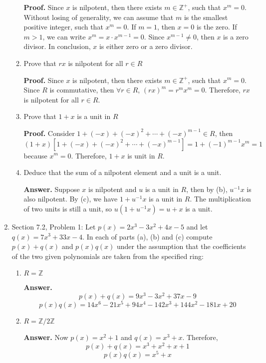 \documentclass[12pt]{article}
\newcommand{\Z}{\mathbb{Z}}
\begin{document}
\begin{enumerate}
\begin{enumerate}
    \smallskip
    {\bf Proof. }Since $x$ is nilpotent, then there exists $m \in \Z^+$, such that $x^m = 0$. Without losing of generality, we can assume that $m$ is the smallest positive integer, such that $x^m = 0$. If $m = 1$, then $x = 0$ is the zero. If $m > 1$, we can write $x^m = x \cdot x^{m-1} = 0$. Since $x^{m-1} \neq 0$, then $x$ is a zero divisor. In conclusion, $x$ is either zero or a zero divisor.
    \bigskip

    \item Prove that $rx$ is nilpotent for all $r \in R$

    \smallskip
    {\bf Proof. }Since $x$ is nilpotent, then there exists $m \in \Z^+$, such that $x^m = 0$. Since $R$ is commutative, then $\forall r \in R$, $(rx)^m = r^m x^m = 0$. Therefore, $rx$ is nilpotent for all $r \in R$.
    \bigskip

    \item Prove that $1 + x$ is a unit in $R$

    \smallskip
    {\bf Proof. }Consider $1 + (-x) + (-x)^2 + \cdots + (-x)^{m-1} \in R$, then $(1+x)[1 + (-x) + (-x)^2 + \cdots + (-x)^{m-1}] = 1 + (-1)^{m-1}x^m = 1$ because $x^m = 0$. Therefore, $1 + x$ is unit in $R$.
    \bigskip

    \item Deduce that the sum of a nilpotent element and a unit is a unit.

    \smallskip
    {\bf Answer. }Suppose $x$ is nilpotent and $u$ is a unit in $R$, then by (b), $u^{-1}x$ is also nilpotent. By (c), we have $1 + u^{-1}x$ is a unit in $R$. The multiplication of two units is still a unit, so $u(1 + u^{-1}x) = u + x$ is a unit.
    \bigskip
\end{enumerate}
\item Section 7.2, Problem 1: Let $p(x) = 2 x^3 - 3 x^2 + 4 x - 5$ and let $q(x) = 7 x^3 + 33 x - 4$. In each of parts (a), (b) and (c) compute $p(x) + q(x)$ and $p(x)q(x)$ under the assumption that the coefficients of the two given polynomials are taken from the specified ring:
\begin{enumerate}
    \item $R = \Z$

    \smallskip
    {\bf Answer. }
    $$
    p(x) + q(x) = 9 x^3 - 3 x^2 + 37x - 9
    $$
    $$
    p(x) q(x) = 14 x^6 - 21 x^5 + 94 x^4 - 142 x^3 + 144 x^2 - 181 x + 20
    $$
    \bigskip

    \item $R = \Z / 2\Z$

    \smallskip
    {\bf Answer. }Now $p(x) = x^2 + 1$ and $q(x) = x^3 + x$. Therefore,
    $$
    p(x) + q(x) = x^3 + x^2 + x + 1
    $$
    $$
    p(x) q(x) = x^5 + x
    $$
    \bigskip


\end{enumerate}
\end{enumerate}
\end{document}
